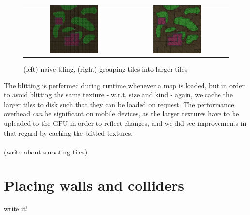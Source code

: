 \begin{figure}[H]
    \centering
    \begin{tabular}{cc}
        \includegraphics[width=0.5\textwidth]{figures/generating_levels/naive-tile.png}
        &
        \includegraphics[width=0.5\textwidth]{figures/generating_levels/grouped-tile.png}
    \end{tabular}
    \caption{(left) naive tiling, (right) grouping tiles into larger tiles}\label{fig:grouped_tiling_comparison}
\end{figure}

The blitting is performed during runtime whenever a map is loaded, but in order
to avoid blitting the same texture - w.r.t. size and kind - again, we cache the
larger tiles to disk such that they can be loaded on request. The performance
overhead \textit{can} be significant on mobile devices, as the larger textures
have to be uploaded to the GPU in order to reflect changes, and we did see
improvements in that regard by caching the blitted textures.
\\\\
(write about smooting tiles)

\section{Placing walls and colliders}
write it!
